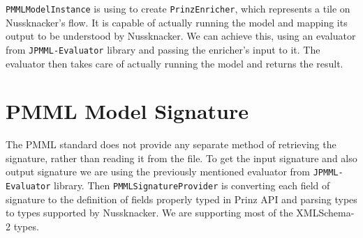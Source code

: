 \texttt{PMMLModelInstance} is using to create \texttt{PrinzEnricher}, which represents a tile on Nussknacker’s flow.
It is capable of actually running the model and mapping its output to be understood by Nussknacker.
We can achieve this, using an evaluator from \texttt{JPMML-Evaluator} library and passing the enricher's input to it.
The evaluator then takes care of actually running the model and returns the result.

\section{PMML Model Signature}

The PMML standard does not provide any separate method of retrieving the signature, rather than reading it from the file.
To get the input signature and also output signature we are using the previously mentioned evaluator from \texttt{JPMML-Evaluator} library.
Then \texttt{PMMLSignatureProvider} is converting each field of signature to the definition of fields properly typed in Prinz API
and parsing types to types supported by Nussknacker.
We are supporting most of the XMLSchema-2 types.
